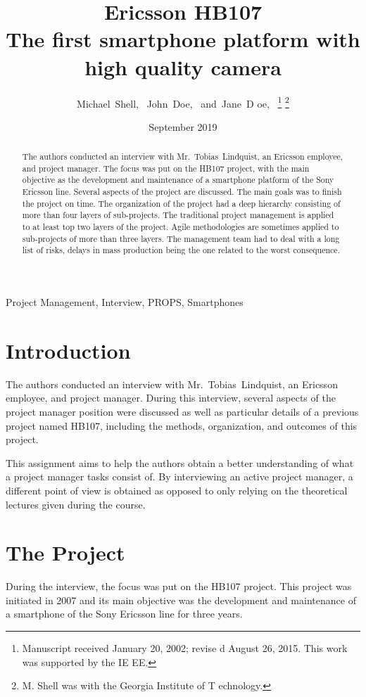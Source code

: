 \documentclass[journal]{IEEEtran}
\title{Ericsson HB107\\\Large{The first smartphone platform with high quality camera}}
\author{Michael~Shell,~\IEEEmembership{Member,~IEEE,
} John~Doe,~\IEEEmembership{Fellow,~OSA,} and~Jane~D
oe,~\IEEEmembership{Life~Fellow,~IEEE}%
\thanks{Manuscript received January 20, 2002; revise
d August 26, 2015. This work was supported by the IE
EE.}%
\thanks{M. Shell was with the Georgia Institute of T
echnology.}}
\date{September 2019}
\begin{document}
\maketitle


\begin{abstract}
The authors conducted an interview with Mr.~Tobias~Lindquist, an Ericsson employee, and project manager. 
The focus was put on the HB107 project, with the main objective as the development and maintenance of a smartphone platform of the Sony Ericsson line. Several aspects of the project are discussed. The main goals was to finish the project on time. The organization of the project had a deep hierarchy consisting of more than four layers of sub-projects. The traditional project management is applied to at least top two layers of the project. Agile methodologies are sometimes applied to sub-projects of more than three layers. The management team had to deal with a long list of risks, delays in mass production being the one related to the worst consequence.
\end{abstract}

\begin{IEEEkeywords}
    Project Management, Interview, PROPS, Smartphones
\end{IEEEkeywords}

\section{Introduction}
The authors conducted an interview with Mr.~Tobias~Lindquist, an Ericsson employee, and project manager. During this interview, several aspects of the project manager position were discussed as well as particular details of a previous project named HB107, including the methods, organization, and outcomes of this project. 

This assignment aims to help the authors obtain a better understanding of what a project manager tasks consist of. By interviewing an active project manager, a different point of view is obtained as opposed to only relying on the theoretical lectures given during the course.

\section{The Project}
During the interview, the focus was put on the HB107 project. This project was initiated in 2007 and its main objective was the development and maintenance of a smartphone of the Sony Ericsson line for three years.
\end{document}
